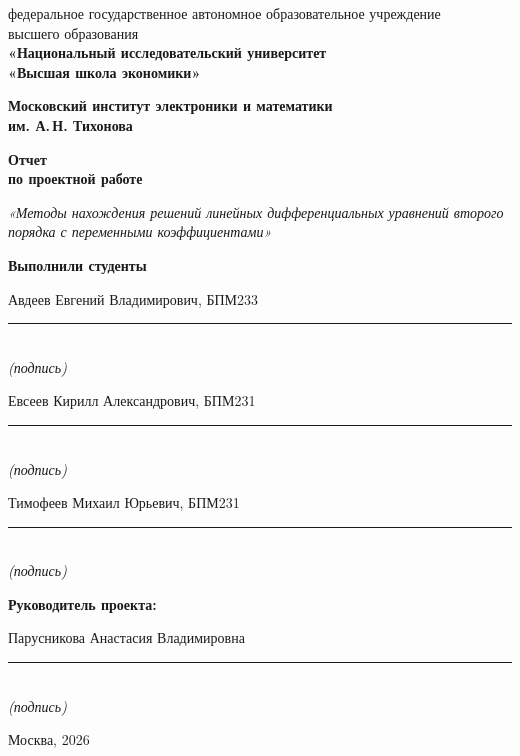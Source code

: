\documentclass[14pt,a4paper]{extarticle}
\begin{document}
\hypersetup{pageanchor=false}
\begin{titlepage}
\ifPDFTeX{}\fi\fontsize{14}{16}\selectfont
\setlength{\parindent}{0pt}
\begin{center}
федеральное государственное автономное образовательное учреждение\\
высшего образования\\
\textbf{«Национальный исследовательский университет\\
«Высшая школа экономики»}

\vspace{6mm}
\textbf{Московский институт электроники и математики\\
им. А.\,Н. Тихонова}

\vspace{29mm}
\textbf{Отчет\\по проектной работе}

\vspace{3mm}
\textit{«Методы нахождения решений линейных дифференциальных уравнений второго порядка с переменными коэффициентами»}
\end{center}

\vspace{18mm}
\begin{flushright}
{\fontsize{12}{14}\selectfont\textbf{Выполнили студенты}}
\end{flushright}
\vspace{3mm}
{\fontsize{12}{15}\selectfont
\newcommand{\studentfield}[1]{%
\begin{minipage}[t]{0.47\textwidth}
\raggedleft
#1\par
\vspace{4mm}
\rule{45mm}{0.4pt}\\[-1mm]
\textit{(подпись)}
\end{minipage}}
\noindent
\studentfield{Авдеев Евгений Владимирович, БПМ233}\hfill
\studentfield{Евсеев Кирилл Александрович, БПМ231}\par
\vspace{8mm}
\noindent
\studentfield{Тимофеев Михаил Юрьевич, БПМ231}\par
}

\vspace{13mm}
\textbf{Руководитель проекта:}\par
\vspace{6mm}
Парусникова Анастасия Владимировна\par
\vspace{5mm}
\rule{55mm}{0.4pt}\\[-1mm]
{\fontsize{12}{14}\selectfont\textit{(подпись)}}

\vfill
\begin{center}Москва, 2026\end{center}
\end{titlepage}
\hypersetup{pageanchor=true}
\restoregeometry
\end{document}
